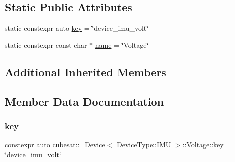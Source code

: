 \subsection*{Static Public Attributes}
\begin{DoxyCompactItemize}
\item 
static constexpr auto \hyperlink{structcubesat_1_1__Device_3_01DeviceType_1_1IMU_01_4_1_1Voltage_a211b2e7eaf6b30cec2ddf9330041def3}{key} = \char`\"{}device\+\_\+imu\+\_\+volt\char`\"{}
\item 
static constexpr const char $\ast$ \hyperlink{structcubesat_1_1__Device_3_01DeviceType_1_1IMU_01_4_1_1Voltage_a6dce968efa87e24737cce0a8058d9575}{name} = \char`\"{}Voltage\char`\"{}
\end{DoxyCompactItemize}
\subsection*{Additional Inherited Members}


\subsection{Member Data Documentation}
\mbox{\label{structcubesat_1_1__Device_3_01DeviceType_1_1IMU_01_4_1_1Voltage_a211b2e7eaf6b30cec2ddf9330041def3}} 
\subsubsection{\texorpdfstring{key}{key}}
{\footnotesize\ttfamily constexpr auto \hyperlink{structcubesat_1_1__Device}{cubesat\+::\+\_\+\+Device}$<$ Device\+Type\+::\+I\+MU $>$\+::Voltage\+::key = \char`\"{}device\+\_\+imu\+\_\+volt\char`\"{}\hspace{0.3cm}{\ttfamily [static]}}

\mbox{\label{structcubesat_1_1__Device_3_01DeviceType_1_1IMU_01_4_1_1Voltage_a6dce968efa87e24737cce0a8058d9575}} 
